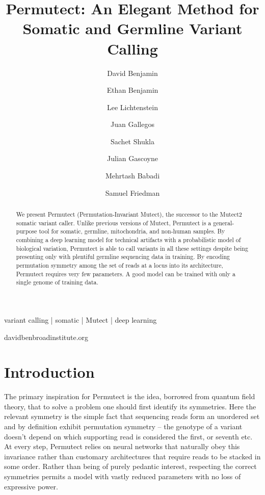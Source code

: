 \documentclass[times, twoside, watermark]{StyleBioRxiv}
\begin{document}
\title{Permutect: An Elegant Method for Somatic and Germline Variant Calling}

\author[1,\Letter]{David Benjamin}
\author[3]{Ethan Benjamin}
\author[1]{Lee Lichtenstein}
\author[2]{Juan Gallegos}
\author[2]{Sachet Shukla}
\author[2]{Julian Gascoyne}
\author[1]{Mehrtash Babadi}
\author[1]{Samuel Friedman}


\maketitle

\begin{abstract}
We present Permutect (Permutation-Invariant Mutect), the successor to the Mutect2 somatic variant caller.  Unlike previous versions of Mutect, Permutect is a general-purpose tool for somatic, germline, mitochondria, and non-human samples.  By combining a deep learning model for technical artifacts with a probabilistic model of biological variation, Permutect is able to call variants in all these settings despite being presenting only with plentiful germline sequencing data in training.  By encoding permutation symmetry among the set of reads at a locus into its architecture, Permutect requires very few parameters.  A good model can be trained with only a single genome of training data.
\end {abstract}

\begin{keywords}
variant calling | somatic | Mutect | deep learning
\end{keywords}

\begin{corrauthor}
davidben\at broadinstitute.org
\end{corrauthor}

\section*{Introduction}
The primary inspiration for Permutect is the idea, borrowed from quantum field theory, that to solve a problem one should first identify its symmetries.  Here the relevant symmetry is the simple fact that sequencing reads form an unordered set and by definition exhibit permutation symmetry -- the genotype of a variant doesn't depend on which supporting read is considered the first, or seventh etc.  At every step, Permutect relies on neural networks that naturally obey this invariance rather than customary architectures that require reads to be stacked in some order.  Rather than being of purely pedantic interest, respecting the correct symmetries permits a model with vastly reduced parameters with no loss of expressive power.
\end{document}
